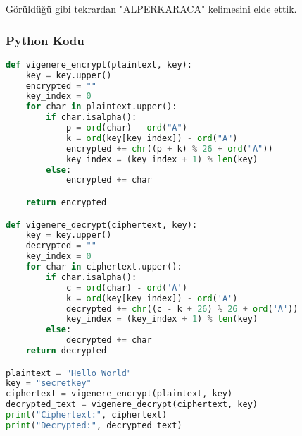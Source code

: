 \begin{table}[ht]
\end{table}

Görüldüğü gibi tekrardan "ALPERKARACA" kelimesini elde ettik.

\subsubsection{Python Kodu}

\begin{lstlisting}[language=Python]
def vigenere_encrypt(plaintext, key):
    key = key.upper()
    encrypted = ""
    key_index = 0
    for char in plaintext.upper():
        if char.isalpha():
            p = ord(char) - ord("A")
            k = ord(key[key_index]) - ord("A")
            encrypted += chr((p + k) % 26 + ord("A"))
            key_index = (key_index + 1) % len(key)
        else:
            encrypted += char

    return encrypted

def vigenere_decrypt(ciphertext, key):
    key = key.upper()
    decrypted = ""
    key_index = 0
    for char in ciphertext.upper():
        if char.isalpha():
            c = ord(char) - ord('A')
            k = ord(key[key_index]) - ord('A')
            decrypted += chr((c - k + 26) % 26 + ord('A'))
            key_index = (key_index + 1) % len(key)
        else:
            decrypted += char 
    return decrypted

plaintext = "Hello World"
key = "secretkey"
ciphertext = vigenere_encrypt(plaintext, key)
decrypted_text = vigenere_decrypt(ciphertext, key)
print("Ciphertext:", ciphertext)
print("Decrypted:", decrypted_text)
\end{lstlisting}


